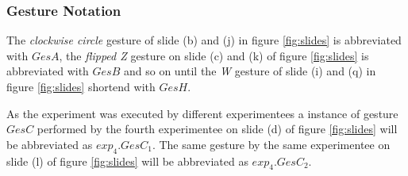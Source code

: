 \subsubsection{Gesture Notation} \label{gesture_notation}
The \textit{clockwise circle} gesture of slide (b) and (j) in figure \ref{fig:slides} is abbreviated with $GesA$, the
\textit{flipped Z} gesture on slide (c) and (k) of figure \ref{fig:slides} is abbreviated with $GesB$ and so on until
the \textit{W} gesture of slide (i) and (q) in figure \ref{fig:slides} shortend with $GesH$.

As the experiment was executed by different experimentees a instance of gesture $GesC$ performed by the fourth
experimentee on slide (d) of figure \ref{fig:slides} will be abbreviated as $exp_{4}.GesC_{1}$. The same gesture by the
same experimentee on slide (l) of figure \ref{fig:slides} will be abbreviated as $exp_{4}.GesC_{2}$.
